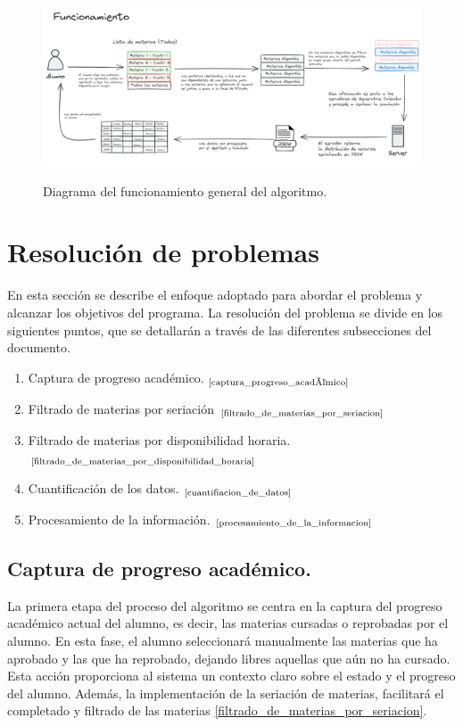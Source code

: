 \begin{figure}[h]
    \centering
    \includegraphics[width=\textwidth]{images/AG-funcionamiento.png}
    \label{Diagrama del funcionamiento general del algoritmo.}
    \caption{Diagrama del funcionamiento general del algoritmo.}
\end{figure}

\section{Resolución de problemas}

En esta sección se describe el enfoque adoptado para abordar el problema y alcanzar los objetivos del programa. La resolución del problema se divide en los siguientes puntos, que se detallarán a través de las diferentes subsecciones del documento.

\begin{enumerate}
    \item Captura de progreso académico. $_{\text{\ref{captura_progreso_académico}}}$
    \item Filtrado de materias por seriación $_{\text{\ref{filtrado_de_materias_por_seriacion}}}$
    \item Filtrado de materias por disponibilidad horaria. $_{\text{\ref{filtrado_de_materias_por_disponibilidad_horaria}}}$
    \item Cuantificación de los datos. $_{\text{\ref{cuantifiacion_de_datos}}}$
    \item Procesamiento de la información. $_{\text{\ref{procesamiento_de_la_informacion}}}$
\end{enumerate}

\subsection{Captura de progreso académico.} \label{captura_progreso_académico}
La primera etapa del proceso del algoritmo se centra en la captura del progreso académico actual del alumno, es decir, las materias cursadas o reprobadas por el alumno. En esta fase, el alumno seleccionará manualmente las materias que ha aprobado y las que ha reprobado, dejando libres aquellas que aún no ha cursado. Esta acción proporciona al sistema un contexto claro sobre el estado y el progreso del alumno. Además, la implementación de la seriación de materias, facilitará el completado y filtrado de las materias \ref{filtrado_de_materias_por_seriacion}. 

